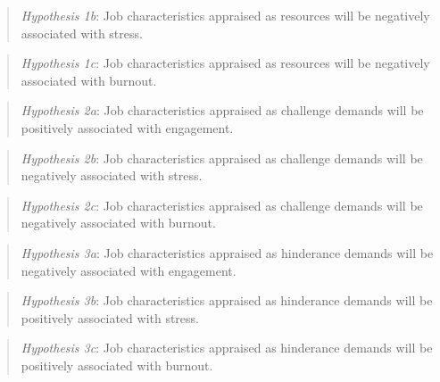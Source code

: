 \documentclass[
  english,
  man]{apa6}
\begin{document}
\begin{quote}
\emph{Hypothesis 1b}: Job characteristics appraised as resources will be negatively associated with stress.
\end{quote}

\begin{quote}
\emph{Hypothesis 1c}: Job characteristics appraised as resources will be negatively associated with burnout.
\end{quote}

\begin{quote}
\emph{Hypothesis 2a}: Job characteristics appraised as challenge demands will be positively associated with engagement.
\end{quote}

\begin{quote}
\emph{Hypothesis 2b}: Job characteristics appraised as challenge demands will be negatively associated with stress.
\end{quote}

\begin{quote}
\emph{Hypothesis 2c}: Job characteristics appraised as challenge demands will be negatively associated with burnout.
\end{quote}

\begin{quote}
\emph{Hypothesis 3a}: Job characteristics appraised as hinderance demands will be negatively associated with engagement.
\end{quote}

\begin{quote}
\emph{Hypothesis 3b}: Job characteristics appraised as hinderance demands will be positively associated with stress.
\end{quote}

\begin{quote}
\emph{Hypothesis 3c}: Job characteristics appraised as hinderance demands will be positively associated with burnout.
\end{quote}
\end{document}
